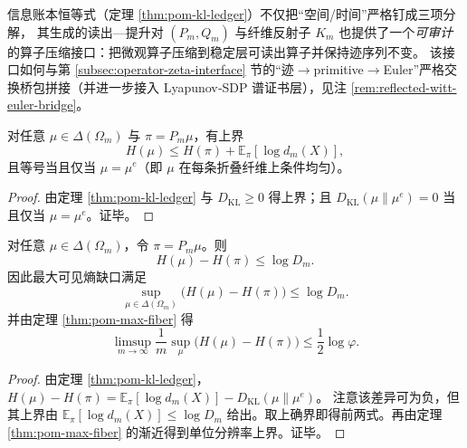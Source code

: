 \begin{remark}\label{rem:pom-ledger-glue-zeta}
信息账本恒等式（定理 \ref{thm:pom-kl-ledger}）不仅把“空间/时间”严格钉成三项分解，
其生成的读出—提升对 \((P_m,Q_m)\) 与纤维反射子 \(K_m\) 也提供了一个\emph{可审计}的算子压缩接口：把微观算子压缩到稳定层可读出算子并保持迹序列不变。
该接口如何与第 \ref{subsec:operator-zeta-interface} 节的“迹$\to$primitive$\to$Euler”严格交换桥包拼接（并进一步接入 Lyapunov‑SDP 谱证书层），见注 \ref{rem:reflected-witt-euler-bridge}。
\end{remark}

\begin{corollary}\label{cor:pom-kl-ledger-bound}
对任意 $\mu\in\Delta(\Omega_m)$ 与 $\pi=P_m\mu$，有上界
\[
H(\mu)\le H(\pi)+\mathbb{E}_{\pi}[\log d_m(X)],
\]
且等号当且仅当 $\mu=\mu^{e}$（即 $\mu$ 在每条折叠纤维上条件均匀）。
\end{corollary}
\begin{proof}
由定理 \ref{thm:pom-kl-ledger} 与 $D_{\mathrm{KL}}\ge 0$ 得上界；且 $D_{\mathrm{KL}}(\mu\|\mu^e)=0$ 当且仅当 $\mu=\mu^e$。证毕。
\end{proof}

\begin{corollary}[最坏熵缺口上界]\label{cor:pom-entropy-gap-bound}
对任意 $\mu\in\Delta(\Omega_m)$，令 $\pi=P_m\mu$。则
\[
H(\mu)-H(\pi)\le \log D_m.
\]
因此最大可见熵缺口满足
\[
\sup_{\mu\in\Delta(\Omega_m)}\bigl(H(\mu)-H(\pi)\bigr)\le \log D_m.
\]
并由定理 \ref{thm:pom-max-fiber} 得
\[
\limsup_{m\to\infty}\frac{1}{m}\sup_{\mu}\bigl(H(\mu)-H(\pi)\bigr)\le \frac12\log\varphi.
\]
\end{corollary}
\begin{proof}
由定理 \ref{thm:pom-kl-ledger}，
\(
H(\mu)-H(\pi)=\mathbb{E}_{\pi}[\log d_m(X)]-D_{\mathrm{KL}}(\mu\|\mu^e)
\)。
注意该差异可为负，但其上界由 $\mathbb{E}_{\pi}[\log d_m(X)]\le \log D_m$ 给出。取上确界即得前两式。再由定理 \ref{thm:pom-max-fiber} 的渐近得到单位分辨率上界。证毕。
\end{proof}

